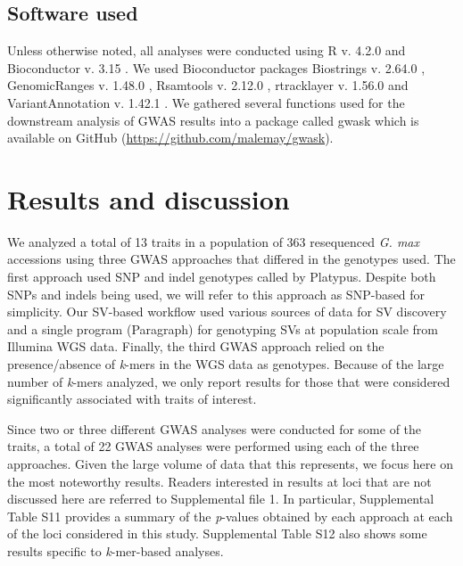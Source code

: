 \documentclass{article}
\begin{document}
\subsection*{Software used}
\label{sv-gwas-software-used}

Unless otherwise noted, all analyses were conducted using R v. 4.2.0
 and Bioconductor v. 3.15 . We used Bioconductor
packages Biostrings v. 2.64.0 , GenomicRanges v. 1.48.0
, Rsamtools v. 2.12.0 , rtracklayer v.
1.56.0  and VariantAnnotation v. 1.42.1
.  We gathered several functions used for the downstream
analysis of GWAS results into a package called gwask which is available on
GitHub (\url{https://github.com/malemay/gwask}).

\clearpage

\section*{Results and discussion}

We analyzed a total of 13 traits in a population of 363 resequenced \textit{G.
max} accessions using three GWAS approaches that differed in the genotypes
used. The first approach used SNP and indel genotypes called by Platypus.
Despite both SNPs and indels being used, we will refer to this approach as
SNP-based for simplicity. Our SV-based workflow used various sources of data
for SV discovery and a single program (Paragraph) for genotyping SVs at
population scale from Illumina WGS data. Finally, the third GWAS approach
relied on the presence/absence of \textit{k}-mers in the WGS data as genotypes.
Because of the large number of \textit{k}-mers analyzed, we only report results
for those that were considered significantly associated with traits of
interest.

Since two or three different GWAS analyses were conducted for some of the
traits, a total of 22 GWAS analyses were performed using each of the three
approaches.  Given the large volume of data that this represents, we focus here
on the most noteworthy results. Readers interested in results at loci that are
not discussed here are referred to Supplemental file 1. In particular, Supplemental Table
S11 provides a summary of the
\textit{p}-values obtained by each approach at each of the loci considered in
this study. Supplemental Table S12 also shows some results specific to \textit{k}-mer-based
analyses.
\end{document}
